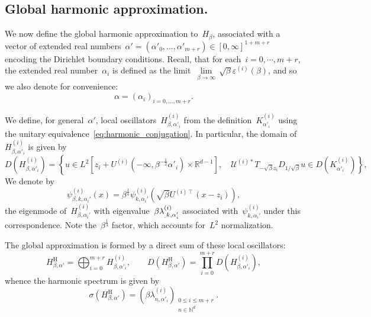 \documentclass[10pt]{article}
\newcommand{\R}{\mathbb{R}}
\newcommand{\n}{\mathrm{n}}
\newcommand{\N}{\mathbb N}
\newcommand{\1}{\mathbbm 1}
\newcommand{\Ki}[1]{K^{(i)}_{#1}}
\newcommand{\psii}[2]{\psi^{(i)}_{#1,#2}}
\newcommand{\lambdai}[2]{\lambda^{(i)}_{#1,#2}}
\newcommand{\varepsiloni}{\varepsilon^{(i)}}
\begin{document}
    \subsection{Global harmonic approximation.\newline}\label{subsec:global_harm_operator}
    We now define the global harmonic approximation to~$H_\beta$, associated with a vector of extended real numbers~$\alpha' = (\alpha'_0,\dots,\alpha'_{m+r}) \in [0,\infty]^{1+m+r}$ encoding the Dirichlet boundary conditions.
    Recall, that for each~$i=0,\dotsm,m+r$, the extended real number~$\alpha_i$ is defined as the limit~$\underset{\beta\to\infty}{\lim}\,\sqrt\beta \varepsiloni(\beta)$, and so we also denote for convenience:
    \begin{equation}
        \label{eq:global_alpha}
        \alpha = \left(\alpha_i\right)_{i=0,\dots,m+r}.
    \end{equation}
    
    We define, for general~$\alpha'$, local oscillators~$H^{(i)}_{\beta,\alpha'_i}$ from the definition~$\Ki{\alpha'_i}$ using the unitary equivalence~\eqref{eq:harmonic_conjugation}. In particular, the domain of~$H_{\beta,\alpha'_i}^{(i)}$ is given by
    \begin{equation}
        \label{eq:local_harm_domain}
        D(H^{(i)}_{\beta,\alpha'_i}) = \left\{ u \in L^2\left[z_i + U^{(i)}(-\infty,\beta^{-\frac12}\alpha'_i)\times \R^{d-1}\right],\quad  \mathcal U^{(i)*}T_{-\sqrt\beta z_i}D_{1/\sqrt\beta}u\in D(\Ki{\alpha'_i})\right\},
    \end{equation}
    We denote by
    \begin{equation}
        \label{eq:harmonic_eigenmode}
        \psii{\beta,k}{\alpha_i'}(x) = \beta^{\frac14}\psii{k}{\alpha_i'}(\sqrt\beta U^{(i)\intercal}(x-z_i)),
    \end{equation}
    the eigenmode of~$H^{(i)}_{\beta,\alpha_i'}$ with eigenvalue~$\beta\lambdai_{k,\alpha_i'}$ associated with~$\psii{k}{\alpha_i'}$ under this correspondence. Note the~$\beta^{\frac14}$ factor, which accounts for~$L^2$ normalization.

    The global approximation is formed by a direct sum of these local oscillators:
    \begin{equation}
        \label{eq:global_harmonic_approximation_conj}
        H_{\beta,\alpha'}^{\mathrm H} = \bigoplus_{i=0}^{m+r} H^{(i)}_{\beta,\alpha'_i},\qquad D(H_{\beta,\alpha'}^{\mathrm H}) = \prod_{i=0}^{m+r} D(H^{(i)}_{\beta,\alpha'_i}),
    \end{equation}
    whence the harmonic spectrum is given by
    \begin{equation}
        \label{eq:full_harmonic_approximation_spectrum}
        \sigma(H_{\beta,\alpha'}^{\mathrm H}) = \left(\beta\lambdai{n}{\alpha'_i}\right)_{\substack{0\leq i\leq m+r\\n\in\N^d}}.
    \end{equation}
    
\end{document}
